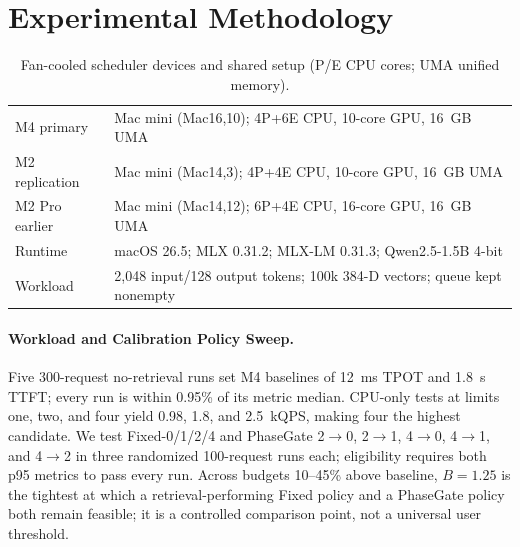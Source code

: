 \documentclass{article}
\begin{document}
\section{Experimental Methodology}

\begin{table}[h]
  \caption{Fan-cooled scheduler devices and shared setup (P/E CPU cores; UMA unified memory).}
  \label{tab:setup}
  \centering
  \footnotesize
  \setlength{\tabcolsep}{3.2pt}
  \begin{tabular}{ll}
    \toprule
    M4 primary & Mac mini (Mac16,10); 4P+6E CPU, 10-core GPU, 16~GB UMA \\
    M2 replication & Mac mini (Mac14,3); 4P+4E CPU, 10-core GPU, 16~GB UMA \\
    M2 Pro earlier & Mac mini (Mac14,12); 6P+4E CPU, 16-core GPU, 16~GB UMA \\
    Runtime & macOS 26.5; MLX 0.31.2; MLX-LM 0.31.3; Qwen2.5-1.5B 4-bit \\
    Workload & 2,048 input/128 output tokens; 100k 384-D vectors; queue kept nonempty \\
    \bottomrule
  \end{tabular}
\end{table}

\paragraph{Workload and Calibration Policy Sweep.}
Five 300-request no-retrieval runs set M4 baselines of 12~ms TPOT and 1.8~s TTFT; every run is within 0.95\% of its metric median.
CPU-only tests at limits one, two, and four yield 0.98, 1.8, and 2.5~kQPS, making four the highest candidate.
We test Fixed-0/1/2/4 and PhaseGate 2$\rightarrow$0, 2$\rightarrow$1, 4$\rightarrow$0, 4$\rightarrow$1, and 4$\rightarrow$2 in three randomized 100-request runs each; eligibility requires both p95 metrics to pass every run.
Across budgets 10--45\% above baseline, $B=1.25$ is the tightest at which a retrieval-performing Fixed policy and a PhaseGate policy both remain feasible; it is a controlled comparison point, not a universal user threshold.
\end{document}
